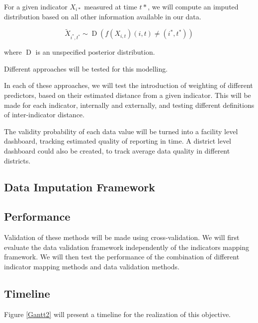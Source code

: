 For a given indicator $X_{i*}$ measured at time $t*$, we will compute an imputed distribution based on all other information available in our data.

$$ \widetilde{X}_{i^*,t^*} \sim \operatorname{D} \left(f\left(X_{i,t}\right)  \left(i,t\right) \neq \left(i^*,t^*\right) \right) $$

where $\operatorname{D}$ is an unspecified posterior distribution.

Different approaches will be tested for this modelling.

In each of these approaches, we will test the introduction of weighting of different predictors, based on their estimated distance from a given indicator. This will be made for each indicator, internally and externally, and testing different definitions of inter-indicator distance.

The validity probability of each data value will be turned into a facility level dashboard, tracking estimated quality of reporting in time. A district level dashboard could also be created, to track average data quality in different districts.

\subsection{Data Imputation Framework}


\subsection{Performance}

Validation of these methods will be made using cross-validation. We will first evaluate the data validation framework independently of the indicators mapping framework. We will then test the performance of the combination of different indicator mapping methods and data validation methods.

\subsection{Timeline}

Figure \ref{Gantt2} will present a timeline for the realization of this objective.

